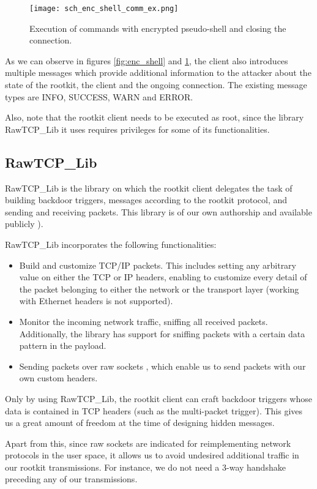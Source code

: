 \begin{figure}[htbp]
	\centering
	\texttt{[image: sch\_enc\_shell\_comm\_ex.png]}
	\caption{Execution of commands with encrypted pseudo-shell and closing the connection.}
	\label{fig:enc_shell_comm_ex}
\end{figure}

As we can observe in figures \ref{fig:enc_shell} and \ref{fig:enc_shell_comm_ex}, the client also introduces multiple messages which provide additional information to the attacker about the state of the rootkit, the client and the ongoing connection. The existing message types are INFO, SUCCESS, WARN and ERROR.

Also, note that the rootkit client needs to be executed as root, since the library RawTCP\_Lib it uses requires privileges for some of its functionalities. 


\subsection{RawTCP\_Lib} \label{subsection:rawtcplib}
RawTCP\_Lib is the library on which the rootkit client delegates the task of building backdoor triggers, messages according to the rootkit protocol, and sending and receiving packets. This library is of our own authorship and available publicly \cite{rawtcp_lib}).

RawTCP\_Lib incorporates the following functionalities:
\begin{itemize}
\item Build and customize TCP/IP packets. This includes setting any arbitrary value on either the TCP or IP headers, enabling to customize every detail of the packet belonging to either the network or the transport layer (working with Ethernet headers is not supported).
\item Monitor the incoming network traffic, sniffing all received packets. Additionally, the library has support for sniffing packets with a certain data pattern in the payload.
\item Sending packets over raw sockets \cite{raw_sockets}, which enable us to send packets with our own custom headers.
\end{itemize}

Only by using RawTCP\_Lib, the rootkit client can craft backdoor triggers whose data is contained in TCP headers (such as the multi-packet trigger). This gives us a great amount of freedom at the time of designing hidden messages. 

Apart from this, since raw sockets are indicated for reimplementing network protocols in the user space, it allows us to avoid undesired additional traffic in our rootkit transmissions. For instance, we do not need a 3-way handshake preceding any of our transmissions.

